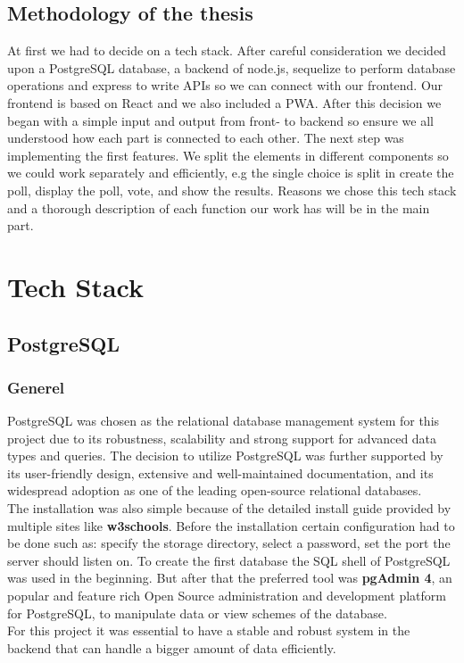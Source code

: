 \documentclass[a4paper,12pt]{report}
\begin{document}
\section{Methodology of the thesis}
At first we had to decide on a tech stack. After careful consideration we decided upon a PostgreSQL database, a backend of node.js, sequelize to perform database operations and express to write APIs so we can connect with our frontend. Our frontend is based on React and we also included a PWA. After this decision we began with a simple input and output from front- to backend so ensure we all understood how each part is connected to each other. The next step was implementing the first features. We split the elements in different components so we could work separately and efficiently, e.g the single choice is split in create the poll, display the poll, vote, and show the results. Reasons we chose this tech stack and a thorough description of each function our work has will be in the main part.  

\chapter{Tech Stack}
\section{PostgreSQL}
\subsection{Generel}
PostgreSQL was chosen as the relational database management system for this project due to its robustness, scalability and strong support for advanced data types and queries. The decision to utilize PostgreSQL was further supported by its user-friendly design, extensive and well-maintained documentation, and its widespread adoption as one of the leading open-source relational databases.\\
The installation was also simple because of the detailed install guide provided by multiple sites like \textbf{w3schools}. Before the installation certain configuration had to be done such as: specify the storage directory, select a password, set the port the server should listen on. To create the first database the SQL shell of PostgreSQL was used in the beginning. But after that the preferred tool was \textbf{pgAdmin 4}, an popular and feature rich Open Source administration and development platform for PostgreSQL, to manipulate data or view schemes of the database.\parencite{pgsinstallation}\\
For this project it was essential to have a stable and robust system in the backend that can handle a bigger amount of data efficiently. 
\end{document}
